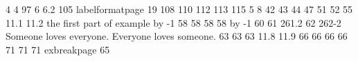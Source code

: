 \relax 
{} {{4}} 
 {{{}}{{4}}}
 {{97}} 
 {{6}} 
 {{6.2}} 
 {{105}} 
\@fd@f labelformatpage {{19}}
 {{108}} 
 {{110}} 
 {{112}} 
 {{113}} 
 {{115}} 
 {{\unhcopy \exnobox }} 
 {{5}} 
 {{8}} 
 {{42}} 
 {{43}} 
 {{44}} 
 {{47}} 
 {{51}} 
 {{52}} 
 {{55}} 
 {{11.1}} 
 {{11.2}} 
 {{the first part of example {\advance \excnt by -1 58}}} 
 {{58}}
 {{{}}{{58}}}
 {{{}}{{58}}}
 {{{\advance \excnt by -1 60}{\it {}}}} 
 {{61}} 
 {{{2}}{{61.2}}}
 {{62}} 
 {{{2}}{{62-2}}}
 {{Someone loves everyone.}} 
 {{Everyone loves someone.}} 
 {{63}} 
 {{{}}{{63}}}
 {{{}}{{63}}}
 {{11.8}} 
 {{11.9}} 
 {{66}}
 {{{}}{{66}}}
 {{{}}{{66}}}
 {{{}}{{66}}}
 {{71}} 
 {{{}}{{71}}}
 {{{}}{{71}}}
\@fd@f exbreakpage {{65}}
